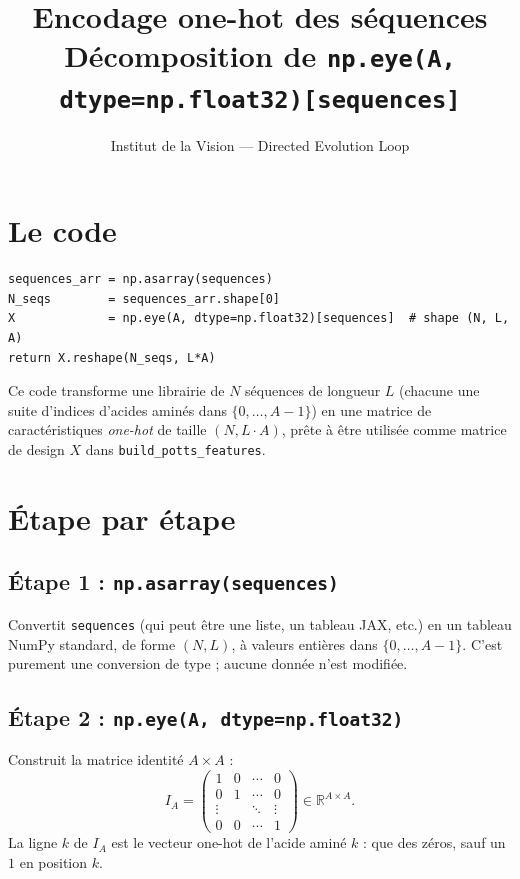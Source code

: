 \documentclass[11pt,a4paper]{article}
\title{\textbf{Encodage one-hot des séquences}\\
\large Décomposition de \texttt{np.eye(A, dtype=np.float32)[sequences]}}
\author{Institut de la Vision --- Directed Evolution Loop}
\date{}
\newcommand{\R}{\mathbb{R}}
\begin{document}
\maketitle

\section{Le code}

\begin{verbatim}
sequences_arr = np.asarray(sequences)
N_seqs        = sequences_arr.shape[0]
X             = np.eye(A, dtype=np.float32)[sequences]  # shape (N, L, A)
return X.reshape(N_seqs, L*A)
\end{verbatim}

Ce code transforme une librairie de $N$ séquences de longueur $L$ (chacune une
suite d'indices d'acides aminés dans $\{0,\ldots,A-1\}$) en une matrice de
caractéristiques \emph{one-hot} de taille $(N, L\cdot A)$, prête à être utilisée
comme matrice de design $X$ dans \texttt{build\_potts\_features}.

\section{Étape par étape}

\subsection*{Étape 1 : \texttt{np.asarray(sequences)}}
Convertit \texttt{sequences} (qui peut être une liste, un tableau JAX, etc.) en
un tableau NumPy standard, de forme $(N, L)$, à valeurs entières dans
$\{0,\ldots,A-1\}$. C'est purement une conversion de type ; aucune donnée n'est
modifiée.

\subsection*{Étape 2 : \texttt{np.eye(A, dtype=np.float32)}}
Construit la matrice identité $A\times A$ :
\[
    I_A =
    \begin{pmatrix}
        1 & 0 & \cdots & 0 \\
        0 & 1 & \cdots & 0 \\
        \vdots & & \ddots & \vdots \\
        0 & 0 & \cdots & 1
    \end{pmatrix} \in \R^{A\times A}.
\]
La ligne $k$ de $I_A$ est le vecteur one-hot de l'acide aminé $k$ : que des
zéros, sauf un $1$ en position $k$.
\end{document}
